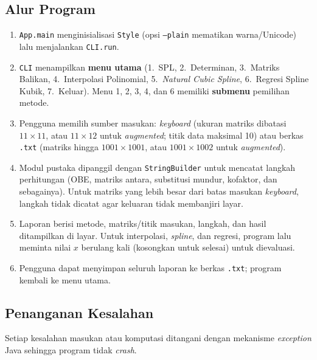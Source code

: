 \documentclass[12pt,a4paper]{article}
\begin{document}
\subsection{Alur Program}
\begin{enumerate}
  \item \texttt{App.main} menginisialisasi \texttt{Style} (opsi \texttt{--plain} mematikan warna/Unicode) lalu menjalankan \texttt{CLI.run}.
  \item \texttt{CLI} menampilkan \textbf{menu utama} (1.~SPL, 2.~Determinan, 3.~Matriks Balikan, 4.~Interpolasi Polinomial, 5.~\textit{Natural Cubic Spline}, 6.~Regresi Spline Kubik, 7.~Keluar). Menu 1, 2, 3, 4, dan 6 memiliki \textbf{submenu} pemilihan metode.
  \item Pengguna memilih sumber masukan: \textit{keyboard} (ukuran matriks dibatasi $11\times11$, atau $11\times12$ untuk \textit{augmented}; titik data maksimal 10) atau berkas \texttt{.txt} (matriks hingga $1001\times1001$, atau $1001\times1002$ untuk \textit{augmented}).
  \item Modul pustaka dipanggil dengan \texttt{StringBuilder} untuk mencatat langkah perhitungan (OBE, matriks antara, substitusi mundur, kofaktor, dan sebagainya). Untuk matriks yang lebih besar dari batas masukan \textit{keyboard}, langkah tidak dicatat agar keluaran tidak membanjiri layar.
  \item Laporan berisi metode, matriks/titik masukan, langkah, dan hasil ditampilkan di layar. Untuk interpolasi, \textit{spline}, dan regresi, program lalu meminta nilai $x$ berulang kali (kosongkan untuk selesai) untuk dievaluasi.
  \item Pengguna dapat menyimpan seluruh laporan ke berkas \texttt{.txt}; program kembali ke menu utama.
\end{enumerate}

\subsection{Penanganan Kesalahan}
Setiap kesalahan masukan atau komputasi ditangani dengan mekanisme \textit{exception} Java sehingga program tidak \textit{crash}.
\end{document}
